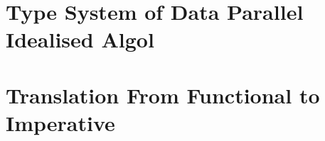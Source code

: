\documentclass[
  nonacm,
  format=acmsmall,
  screen=true,
  timestamp=true
]{acmart}
\begin{document}
\maketitle


\section{Type System of Data Parallel Idealised Algol}
\label{sec:typeSystem}


\clearpage

\section{Translation From Functional to Imperative}
\label{sec:translation}


\clearpage


\end{document}
